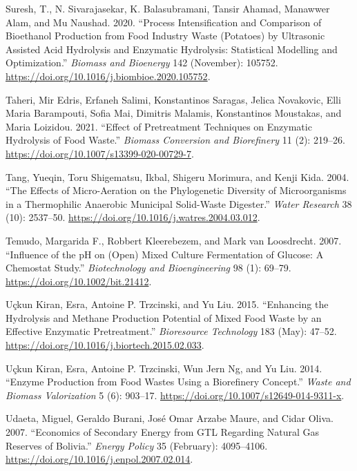 \documentclass[11pt]{report}
\begin{document}
\begin{hangparas}{1.5em}{1}
\hypertarget{citeproc_bib_item_71}{Suresh, T., N. Sivarajasekar, K. Balasubramani, Tansir Ahamad, Manawwer Alam, and Mu Naushad. 2020. “Process Intensification and Comparison of Bioethanol Production from Food Industry Waste (Potatoes) by Ultrasonic Assisted Acid Hydrolysis and Enzymatic Hydrolysis: Statistical Modelling and Optimization.” \textit{Biomass and Bioenergy} 142 (November): 105752. \url{https://doi.org/10.1016/j.biombioe.2020.105752}.}

\hypertarget{citeproc_bib_item_72}{Taheri, Mir Edris, Erfaneh Salimi, Konstantinos Saragas, Jelica Novakovic, Elli Maria Barampouti, Sofia Mai, Dimitris Malamis, Konstantinos Moustakas, and Maria Loizidou. 2021. “Effect of Pretreatment Techniques on Enzymatic Hydrolysis of Food Waste.” \textit{Biomass Conversion and Biorefinery} 11 (2): 219–26. \url{https://doi.org/10.1007/s13399-020-00729-7}.}

\hypertarget{citeproc_bib_item_73}{Tang, Yueqin, Toru Shigematsu, Ikbal, Shigeru Morimura, and Kenji Kida. 2004. “The Effects of Micro-Aeration on the Phylogenetic Diversity of Microorganisms in a Thermophilic Anaerobic Municipal Solid-Waste Digester.” \textit{Water Research} 38 (10): 2537–50. \url{https://doi.org/10.1016/j.watres.2004.03.012}.}

\hypertarget{citeproc_bib_item_74}{Temudo, Margarida F., Robbert Kleerebezem, and Mark van Loosdrecht. 2007. “Influence of the pH on (Open) Mixed Culture Fermentation of Glucose: A Chemostat Study.” \textit{Biotechnology and Bioengineering} 98 (1): 69–79. \url{https://doi.org/10.1002/bit.21412}.}

\hypertarget{citeproc_bib_item_75}{Uçkun Kiran, Esra, Antoine P. Trzcinski, and Yu Liu. 2015. “Enhancing the Hydrolysis and Methane Production Potential of Mixed Food Waste by an Effective Enzymatic Pretreatment.” \textit{Bioresource Technology} 183 (May): 47–52. \url{https://doi.org/10.1016/j.biortech.2015.02.033}.}

\hypertarget{citeproc_bib_item_76}{Uçkun Kiran, Esra, Antoine P. Trzcinski, Wun Jern Ng, and Yu Liu. 2014. “Enzyme Production from Food Wastes Using a Biorefinery Concept.” \textit{Waste and Biomass Valorization} 5 (6): 903–17. \url{https://doi.org/10.1007/s12649-014-9311-x}.}

\hypertarget{citeproc_bib_item_77}{Udaeta, Miguel, Geraldo Burani, José Omar Arzabe Maure, and Cidar Oliva. 2007. “Economics of Secondary Energy from GTL Regarding Natural Gas Reserves of Bolivia.” \textit{Energy Policy} 35 (February): 4095–4106. \url{https://doi.org/10.1016/j.enpol.2007.02.014}.}


\end{hangparas}
\end{document}
